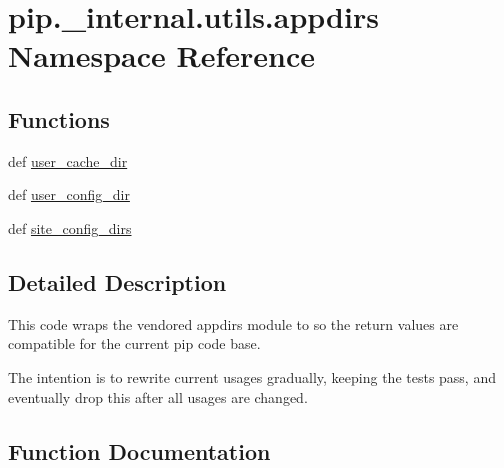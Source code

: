\hypertarget{namespacepip_1_1__internal_1_1utils_1_1appdirs}{}\section{pip.\+\_\+internal.\+utils.\+appdirs Namespace Reference}
\label{namespacepip_1_1__internal_1_1utils_1_1appdirs}
\subsection*{Functions}
\begin{DoxyCompactItemize}
\item 
def \hyperlink{namespacepip_1_1__internal_1_1utils_1_1appdirs_ae9caeed940187f0f036ed701a099b0c2}{user\+\_\+cache\+\_\+dir}
\item 
def \hyperlink{namespacepip_1_1__internal_1_1utils_1_1appdirs_ae7b2023efe644ef8aa2b36362630d210}{user\+\_\+config\+\_\+dir}
\item 
def \hyperlink{namespacepip_1_1__internal_1_1utils_1_1appdirs_a69380ecd4c0eff292e6f7b73a88cd4f0}{site\+\_\+config\+\_\+dirs}
\end{DoxyCompactItemize}


\subsection{Detailed Description}
\begin{DoxyVerb}This code wraps the vendored appdirs module to so the return values are
compatible for the current pip code base.

The intention is to rewrite current usages gradually, keeping the tests pass,
and eventually drop this after all usages are changed.
\end{DoxyVerb}
 

\subsection{Function Documentation}
\mbox{\label{namespacepip_1_1__internal_1_1utils_1_1appdirs_a69380ecd4c0eff292e6f7b73a88cd4f0}} 

